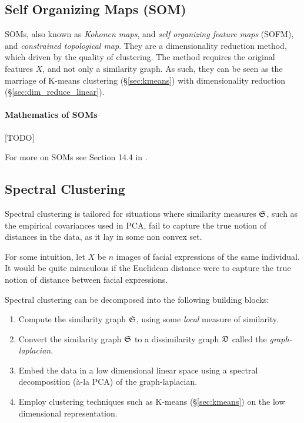 \subsection{Self Organizing Maps (SOM)}
\label{sec:som}
SOMs, also known as \emph{Kohonen maps}, and \emph{self organizing feature maps} (SOFM), and \emph{constrained topological map}. 
They are a dimensionality reduction method, which driven by the quality of clustering.
The method requires the original features $X$, and not only a similarity graph. 
As such, they can be seen as the marriage of K-means clustering (\S\ref{sec:kmeans}) with dimensionality reduction (\S\ref{sec:dim_reduce_linear}).



\paragraph{Mathematics of SOMs}
[TODO]

For more on SOMs see Section 14.4 in \cite{hastie_elements_2003}. 




\subsection{Spectral Clustering}
\label{sec:spectral_clustering}

Spectral clustering is tailored for situations where \naive similarity measures $\mathfrak{S}$, such as the empirical covariances used in PCA, fail to capture the true notion of distances in the data, as it lay in some non convex set. 

For some intuition, let $X$ be $n$ images of facial expressions of the same individual. It would be quite miraculous if the Euclidean distance were to capture the true notion of distance between facial expressions. 

Spectral clustering can be decomposed into the following building blocks:
\begin{enumerate}
\item Compute the similarity graph $\mathfrak{S}$, using some \emph{local} measure of similarity.
\item Convert the similarity graph $\mathfrak{S}$ to a dissimilarity graph $\mathfrak{D}$ called the \emph{graph-laplacian}.
\item Embed the data in a low dimensional linear space using a spectral decomposition (\`a-la PCA) of the graph-laplacian.
\item Employ clustering techniques such as K-means (\S\ref{sec:kmeans}) on the low dimensional representation.
\end{enumerate}

